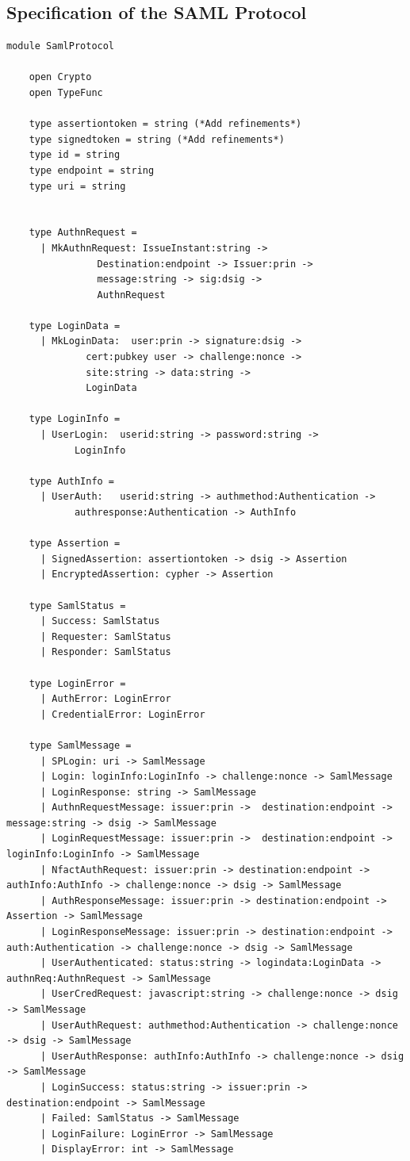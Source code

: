 \documentclass[twosided]{report}
\begin{document}
\subsection{Specification of the SAML Protocol}
\begin{lstlisting}[style=fstar, caption={Specification of the SAML Protocol elements}]
	module SamlProtocol
	
	open Crypto
	open TypeFunc

	type assertiontoken = string (*Add refinements*)
	type signedtoken = string (*Add refinements*)
	type id = string
	type endpoint = string
	type uri = string


	type AuthnRequest = 
	  | MkAuthnRequest: IssueInstant:string ->
			    Destination:endpoint -> Issuer:prin ->
			    message:string -> sig:dsig ->
			    AuthnRequest

	type LoginData = 
	  | MkLoginData:  user:prin -> signature:dsig ->
			  cert:pubkey user -> challenge:nonce ->
			  site:string -> data:string ->
			  LoginData

	type LoginInfo =
	  | UserLogin:  userid:string -> password:string ->
			LoginInfo

	type AuthInfo =
	  | UserAuth:   userid:string -> authmethod:Authentication ->
			authresponse:Authentication -> AuthInfo

	type Assertion =
	  | SignedAssertion: assertiontoken -> dsig -> Assertion
	  | EncryptedAssertion: cypher -> Assertion

	type SamlStatus =
	  | Success: SamlStatus
	  | Requester: SamlStatus
	  | Responder: SamlStatus

	type LoginError =
	  | AuthError: LoginError
	  | CredentialError: LoginError

	type SamlMessage =
	  | SPLogin: uri -> SamlMessage
	  | Login: loginInfo:LoginInfo -> challenge:nonce -> SamlMessage
	  | LoginResponse: string -> SamlMessage
	  | AuthnRequestMessage: issuer:prin ->  destination:endpoint -> message:string -> dsig -> SamlMessage
	  | LoginRequestMessage: issuer:prin ->  destination:endpoint -> loginInfo:LoginInfo -> SamlMessage 
	  | NfactAuthRequest: issuer:prin -> destination:endpoint -> authInfo:AuthInfo -> challenge:nonce -> dsig -> SamlMessage
	  | AuthResponseMessage: issuer:prin -> destination:endpoint -> Assertion -> SamlMessage
	  | LoginResponseMessage: issuer:prin -> destination:endpoint -> auth:Authentication -> challenge:nonce -> dsig -> SamlMessage
	  | UserAuthenticated: status:string -> logindata:LoginData -> authnReq:AuthnRequest -> SamlMessage
	  | UserCredRequest: javascript:string -> challenge:nonce -> dsig -> SamlMessage
	  | UserAuthRequest: authmethod:Authentication -> challenge:nonce -> dsig -> SamlMessage
	  | UserAuthResponse: authInfo:AuthInfo -> challenge:nonce -> dsig -> SamlMessage
	  | LoginSuccess: status:string -> issuer:prin -> destination:endpoint -> SamlMessage
	  | Failed: SamlStatus -> SamlMessage
	  | LoginFailure: LoginError -> SamlMessage
	  | DisplayError: int -> SamlMessage



\end{lstlisting}
\end{document}
